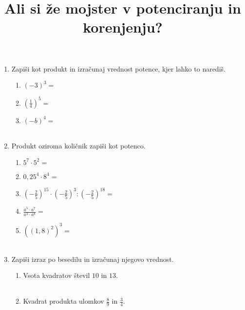 \documentclass[12pt,a4paper]{article}
\title{Ali si že mojster v potenciranju in korenjenju?}
\author{}
\date{}
\begin{document}
\maketitle

\begin{enumerate}
    \item Zapiši kot produkt in izračunaj vrednost potence, kjer lahko to narediš.
    \begin{enumerate}
        \item $(-3)^3=$ \\
        \item $\left(\frac{1}{4}\right)^5=$ \\
        \item $(-b)^4=$ \\ \\
    \end{enumerate}

    \item Produkt oziroma količnik zapiši kot potenco.
    \begin{enumerate}
        \item $5^7\cdot 5^2=$ \\
        \item $0,25^4\cdot 8^4=$ \\
        \item $\left(-\frac{2}{5}\right)^{15}\cdot\left(-\frac{2}{5}\right)^3:\left(-\frac{2}{5}\right)^{18}=$ \\
        \item $\frac{a^5\cdot a^7}{a^3\cdot a^8}=$ \\
        \item $\left(\left(1,8\right)^2\right)^3=$ \\ \\
    \end{enumerate}
    
    \item Zapiši izraz po besedilu in izračunaj njegovo vrednost.
    \begin{enumerate}
        \item Vsota kvadratov števil $10$ in $13$. \\ \\
        \item Kvadrat produkta ulomkov $\frac{8}{9}$ in $\frac{3}{4}$. \\ \\ \\
    \end{enumerate}


\end{enumerate}
\end{document}
